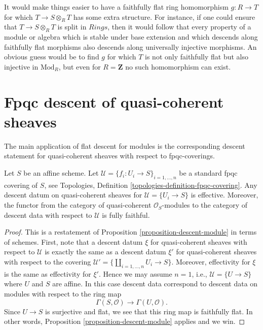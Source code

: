 \begin{remark}
\label{remark-when-locally-split}
It would make things easier to have a faithfully
flat ring homomorphism $g: R \to T$ for which $T \to S \otimes_R T$ has some 
extra structure.
For instance, if one could ensure that $T \to S \otimes_R T$ is split in 
$\textit{Rings}$,
then it would follow that every property of a module or algebra which is stable 
under base extension
and which descends along faithfully flat morphisms also descends along 
universally injective morphisms.
An obvious guess would be to find $g$ for which $T$ is not only faithfully flat 
but also injective in $\text{Mod}_R$,
but even for $R = \mathbf{Z}$ no such homomorphism can exist.
\end{remark}
















\section{Fpqc descent of quasi-coherent sheaves}
\label{section-fpqc-descent-quasi-coherent}

\noindent
The main application of flat descent for modules is
the corresponding descent statement for quasi-coherent
sheaves with respect to fpqc-coverings.

\begin{lemma}
\label{lemma-standard-fpqc-covering}
Let $S$ be an affine scheme.
Let $\mathcal{U} = \{f_i : U_i \to S\}_{i = 1, \ldots, n}$
be a standard fpqc covering of $S$, see
Topologies, Definition \ref{topologies-definition-fpqc-covering}.
Any descent datum on quasi-coherent sheaves
for $\mathcal{U} = \{U_i \to S\}$ is effective.
Moreover, the functor from the category of
quasi-coherent $\mathcal{O}_S$-modules to the category
of descent data with respect to $\mathcal{U}$ is fully faithful.
\end{lemma}

\begin{proof}
This is a restatement of Proposition \ref{proposition-descent-module}
in terms of schemes. First, note that a descent datum $\xi$
for quasi-coherent sheaves with respect to $\mathcal{U}$
is exactly the same as a descent datum $\xi'$ for quasi-coherent sheaves
with respect to the covering
$\mathcal{U}' = \{\coprod_{i = 1, \ldots, n} U_i \to S\}$.
Moreover, effectivity for $\xi$ is the same as effectivity for $\xi'$.
Hence we may assume $n = 1$, i.e., $\mathcal{U} = \{U \to S\}$
where $U$ and $S$ are affine. In this case descent data
correspond to descent data on modules with respect to the ring map
$$
\Gamma(S, \mathcal{O})
\longrightarrow
\Gamma(U, \mathcal{O}).
$$
Since $U \to S$ is surjective and flat, we see that this ring map
is faithfully flat. In other words,
Proposition \ref{proposition-descent-module} applies and we win.
\end{proof}

